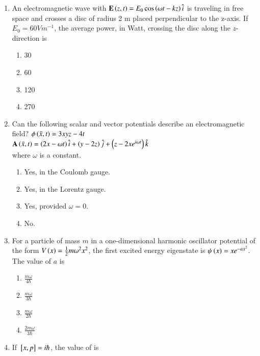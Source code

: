 \documentclass[journal]{IEEEtran}
\begin{document}
\begin{enumerate}
	\item An electromagnetic wave with $\mathbf{E}\left(z,t\right)=E_0\cos\left(\omega t-kz\right)\hat{i}$ is traveling in free space and crosses a disc of radius 2 m placed perpendicular to the z-axis. If $E_0=60 V m^{-1}$, the average power, in Watt, crossing the disc along the $z$-direction is 
\begin{multicols}{4}
\begin{enumerate}
    \item 30
    \item 60
    \item 120
    \item 270
\end{enumerate}
\end{multicols}
\item Can the following scalar and vector potentials describe an electromagnetic field? 
$\phi\left(\bar{x},t\right)=3xyz-4t$ \\
$\mathbf{A}\left(\bar{x},t\right)=\left(2x-\omega t\right)\hat{i}+\left(y-2z\right)\hat{j}+\left(z-2xe^{i\omega t}\right)\hat{k}$
\\ where $\omega$ is a constant.
\begin{multicols}{2}
    \begin{enumerate}
        \item Yes, in the Coulomb gauge.
        \item Yes, in the Lorentz gauge.
        \item Yes, provided $\omega = 0$.
        \item No.
    \end{enumerate}
\end{multicols}
\item For a particle of mass $m$ in a one-dimensional harmonic oscillator potential of the form $V\left(x\right)=\frac{1}{2}m{\omega}^2x^2$, the first excited energy eigenstate is $\psi \left(x\right)=xe^{-ax^2}$. The value of $a$ is
\begin{multicols}{4}
    \begin{enumerate}
	    \item $\frac{m\omega}{4\hbar}$
	    \item $\frac{m\omega}{3\hbar}$
	    \item $\frac{m\omega}{2\hbar}$
	    \item $\frac{2m\omega}{3\hbar}$
    \end{enumerate}
\end{multicols}
\item If ${}\left[x,p\right]=i\hbar$, the value of  is

\end{enumerate}
\end{document}
